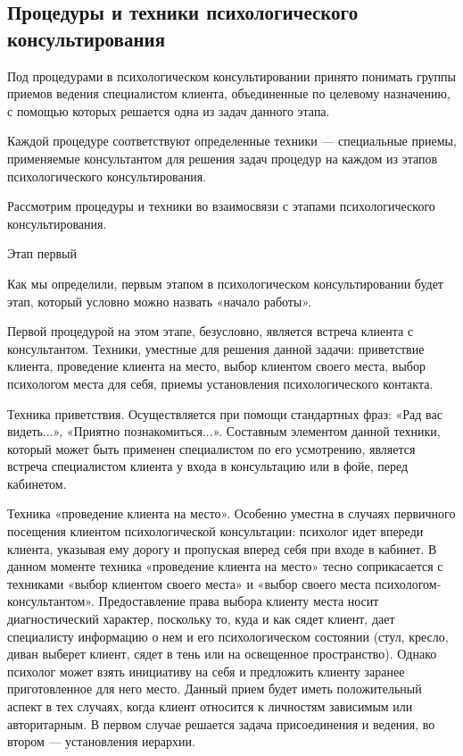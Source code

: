 \documentclass[a4paper, 12pt]{report}
\begin{document}
    \subsection*{Процедуры и техники психологического консультирования}
    Под процедурами в психологическом консультировании принято понимать 
    группы приемов ведения специалистом клиента, объединенные по целевому 
    назначению, с помощью которых решается одна из задач данного этапа.

    Каждой процедуре соответствуют определенные техники — специальные 
    приемы, применяемые консультантом для решения задач процедур на 
    каждом из этапов психологического консультирования.
    
    Рассмотрим процедуры и техники во взаимосвязи с этапами 
    психологического консультирования.
    
    Этап первый
    
    Как мы определили, первым этапом в психологическом консультировании 
    будет этап, который условно можно назвать «начало работы».
    
    Первой процедурой на этом этапе, безусловно, является встреча клиента 
    с консультантом. Техники, уместные для решения данной задачи: 
    приветствие клиента, проведение клиента на место, выбор клиентом 
    своего места, выбор психологом места для себя, приемы установления 
    психологического контакта.    
   
    Техника приветствия. Осуществляется при помощи стандартных фраз: 
    «Рад вас видеть...», «Приятно познакомиться...». Составным элементом 
    данной техники, который может быть применен специалистом по его 
    усмотрению, является встреча специалистом клиента у входа в 
    консультацию или в фойе, перед кабинетом.
    
    Техника «проведение клиента на место». Особенно уместна в случаях 
    первичного посещения клиентом психологической консультации: психолог 
    идет впереди клиента, указывая ему дорогу и пропуская вперед себя при 
    входе в кабинет. В данном моменте техника «проведение клиента 
    на место» тесно соприкасается с техниками «выбор клиентом своего 
    места» и «выбор своего места психологом-консультантом». 
    Предоставление права выбора клиенту места носит диагностический 
    характер, поскольку то, куда и как сядет клиент, дает специалисту 
    информацию о нем и его психологическом состоянии (стул, кресло, 
    диван выберет клиент, сядет в тень или на освещенное пространство). 
    Однако психолог может взять инициативу на себя и предложить клиенту 
    заранее приготовленное для него место. Данный прием будет иметь 
    положительный аспект в тех случаях, когда клиент относится к 
    личностям зависимым или авторитарным. В первом случае решается 
    задача присоединения и ведения, во втором — установления иерархии.    
\end{document}
